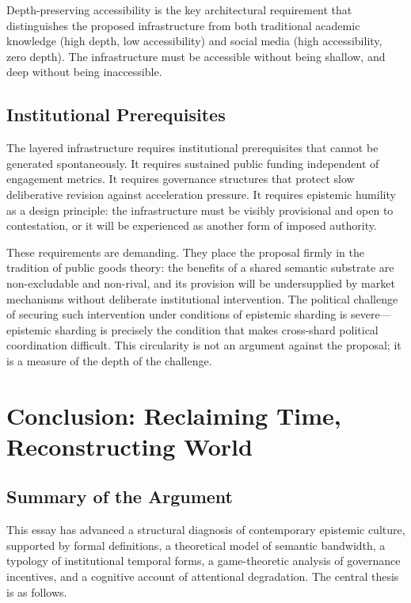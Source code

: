\documentclass[12pt]{article}
\theoremstyle{definition}
\theoremstyle{plain}
\begin{document}
Depth-preserving accessibility is the key architectural requirement that distinguishes the proposed infrastructure from both traditional academic knowledge (high depth, low accessibility) and social media (high accessibility, zero depth). The infrastructure must be accessible without being shallow, and deep without being inaccessible.

\subsection{Institutional Prerequisites}

The layered infrastructure requires institutional prerequisites that cannot be generated spontaneously. It requires sustained public funding independent of engagement metrics. It requires governance structures that protect slow deliberative revision against acceleration pressure. It requires epistemic humility as a design principle: the infrastructure must be visibly provisional and open to contestation, or it will be experienced as another form of imposed authority.

These requirements are demanding. They place the proposal firmly in the tradition of public goods theory: the benefits of a shared semantic substrate are non-excludable and non-rival, and its provision will be undersupplied by market mechanisms without deliberate institutional intervention. The political challenge of securing such intervention under conditions of epistemic sharding is severe---epistemic sharding is precisely the condition that makes cross-shard political coordination difficult. This circularity is not an argument against the proposal; it is a measure of the depth of the challenge.

\section{Conclusion: Reclaiming Time, Reconstructing World}
\label{sec:conclusion}

\subsection{Summary of the Argument}

This essay has advanced a structural diagnosis of contemporary epistemic culture, supported by formal definitions, a theoretical model of semantic bandwidth, a typology of institutional temporal forms, a game-theoretic analysis of governance incentives, and a cognitive account of attentional degradation. The central thesis is as follows.
\end{document}
